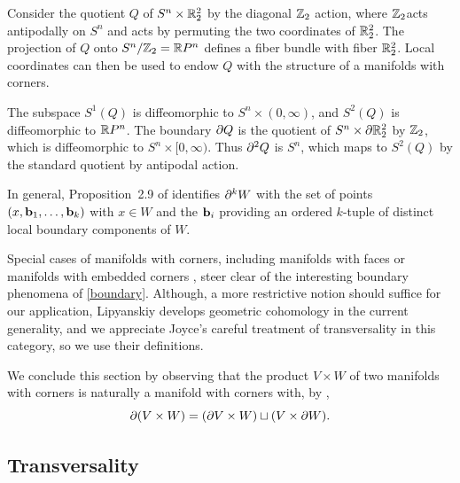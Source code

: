 \begin{example}\label{boundary}
	Consider the quotient $Q$ of $S^n \times \mathbb{R}^2_2$ by the diagonal $\mathbb{Z}_2$ action, where $\mathbb{Z}_2$acts antipodally on $S^n$ and acts by permuting the two coordinates
	of $\mathbb{R}^2_2$.
	The projection of $Q$ onto $S^n / \mathbb{Z}_2 = \mathbb{R} P^n$ defines a fiber bundle with fiber $\mathbb{R}^2_2$.
	Local coordinates can then be used to endow $Q$ with the structure of a manifolds with corners.

	The subspace $S^1(Q)$ is diffeomorphic to $S^n \times (0,\infty)$, and $S^2(Q)$ is diffeomorphic to $\mathbb{R} P^n$.
	The boundary $\partial Q$ is the quotient of $S^n \times \partial \mathbb{R}^2_2$ by $\mathbb{Z}_2$, which is diffeomorphic to
	$S^n \times [0,\infty)$.
	Thus $\partial^2 Q$ is $S^n$, which maps to $S^2(Q)$ by the standard quotient by antipodal action.
\end{example}

In general, Proposition~2.9 of \cite{Joy12} identifies $\partial^k W$ with the set of points $(x,\mathbf{b}_1,\ldots,\mathbf{b}_k)$ with $x \in W$ and the $\mathbf{b}_i$ providing an ordered $k$-tuple of distinct local boundary components of $W$.

Special cases of manifolds with corners, including
manifolds with faces or manifolds with embedded corners \cite{Joy12}, steer clear of the interesting boundary phenomena of \cref{boundary}.
Although, a more restrictive notion should suffice for our application, Lipyanskiy develops geometric cohomology in the current generality, and we appreciate Joyce's careful treatment of transversality in this category, so we use their definitions.

We conclude this section by observing that the product $V \times W$ of two manifolds with corners is naturally a manifold with corners with, by \cite[Proposition 2.12]{Joy12},
$$\partial (V \times W) = (\partial V \times W) \sqcup (V \times \partial W).$$

\subsection{Transversality}\label{S: first transversality}

